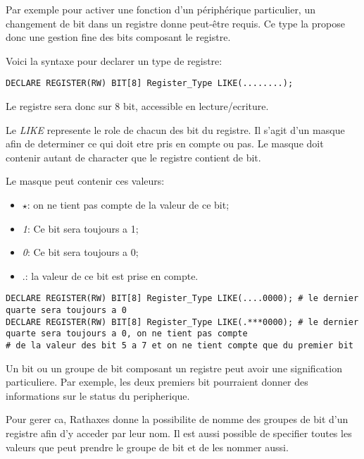 \documentclass{rtxreport}
\begin{document}
Par exemple pour activer une fonction d’un périphérique particulier, un
changement de bit dans un registre donne peut-être requis.
Ce type la propose donc une gestion fine des bits composant le registre.

Voici la syntaxe pour declarer un type de registre:
\begin{lstlisting}[caption=Declaration d'un type de registre sur un octet]
DECLARE REGISTER(RW) BIT[8] Register_Type LIKE(........);
\end{lstlisting}

Le registre sera donc sur 8 bit, accessible en lecture/ecriture.

Le \emph{LIKE} represente le role de chacun des bit du registre. Il s'agit
d'un masque afin de determiner ce qui doit etre pris en compte ou pas.
Le masque doit contenir autant de character que le registre contient de bit.

Le masque peut contenir ces valeurs:
\begin{itemize}
	\item $\star$: on ne tient pas compte de la valeur de ce bit;
	\item \emph{1}: Ce bit sera toujours a 1;
	\item \emph{0}: Ce bit sera toujours a 0;
	\item .: la valeur de ce bit est prise en compte.
\end{itemize}
\begin{lstlisting}[caption=Exemple de masque different]
DECLARE REGISTER(RW) BIT[8] Register_Type LIKE(....0000); # le dernier quarte sera toujours a 0
DECLARE REGISTER(RW) BIT[8] Register_Type LIKE(.***0000); # le dernier quarte sera toujours a 0, on ne tient pas compte
# de la valeur des bit 5 a 7 et on ne tient compte que du premier bit
\end{lstlisting}


Un bit ou un groupe de bit composant un registre peut avoir une signification particuliere.
Par exemple, les deux premiers bit pourraient donner des informations sur le status du
peripherique.

Pour gerer ca, Rathaxes donne la possibilite de nomme des groupes de bit d'un registre
afin d'y acceder par leur nom. Il est aussi possible de specifier toutes les valeurs
que peut prendre le groupe de bit et de les nommer aussi.
\end{document}
